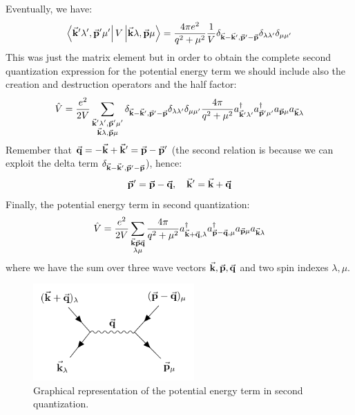 \documentclass[../main/main.tex]{subfiles}
\begin{document}
\begin{itemize}
\begin{equation*}
\end{equation*}
Eventually, we have:
\begin{equation*}
  \bra{\va{k}'\lambda ', \va{p}' \mu '} V \ket{\va{k} \lambda , \va{p} \mu } =
  \frac{4 \pi e^2}{q^2 + \mu ^2} \frac{1}{V} \delta _{\va{k}-\va{k}', \va{p}'-\va{p}} \delta _{\lambda \lambda'} \delta _{\mu \mu '}
\end{equation*}
This was just the matrix element but in order to obtain the complete second quantization expression for the potential energy term we should include also the creation and destruction operators and the half factor:
\begin{equation*}
  \hat{V} = \frac{e^2}{2V} \sum_{\substack{\va{k}' \lambda ', \va{p}'\mu ' \\ \va{k}\lambda , \va{p} \mu  } }^{}
 \delta _{\va{k}-\va{k}', \va{p}'-\va{p}} \delta _{\lambda \lambda'} \delta _{\mu \mu '} \frac{4 \pi }{q^2 + \mu ^2}
  a_{\va{k}'\lambda '} ^\dag a_{\va{p}'\mu '} ^\dag a_{\va{p} \mu} a_{\va{k} \lambda }
\end{equation*}
Remember that \( \va{q} = -\va{k} + \va{k}' = \va{p} - \va{p}' \) (the second relation is because we can exploit the delta term \(\delta _{\va{k}-\va{k}', \va{p}'-\va{p}}  \)), hence:
\begin{equation*}
  \va{p}' = \va{p} - \va{q}, \quad \va{k}' = \va{k} + \va{q}
\end{equation*}
Finally, the potential energy term in second quantization:
\begin{equation*}
  \hat{V} = \frac{e^2}{2V} \sum_{\substack{\va{k}\va{p} \va{q} \\ \lambda \mu  } }^{} \frac{4 \pi }{q^2 + \mu ^2} a_{\va{k}+\va{q}, \lambda } ^\dag a_{\va{p}-\va{q},\mu } ^\dag a_{\va{p}\mu } a_{\va{k} \lambda }
\end{equation*}
where we have the sum over three wave vectors \( \va{k},\va{p}, \va{q} \) and two spin indexes \( \lambda ,\mu  \).

\begin{figure}[h!]
\centering
\includegraphics[width=0.55\textwidth]{../lessons/4_image/4.pdf}
\caption{\label{fig:4_3} Graphical representation of the potential energy term in second quantization.}
\end{figure}


\end{itemize}
\end{document}
